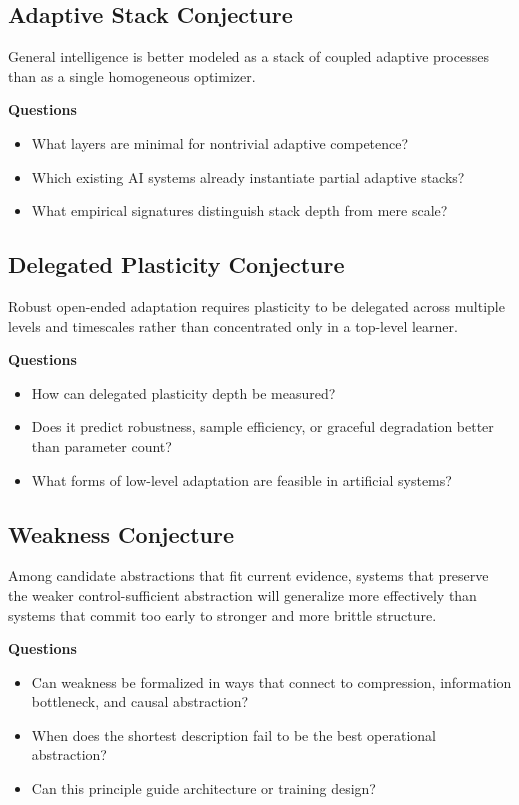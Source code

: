 \documentclass[11pt]{article}
\begin{document}
\subsection{Adaptive Stack Conjecture}

General intelligence is better modeled as a stack of coupled adaptive processes than as a single homogeneous optimizer.

\textbf{Questions}
\begin{itemize}
\item What layers are minimal for nontrivial adaptive competence?
\item Which existing AI systems already instantiate partial adaptive stacks?
\item What empirical signatures distinguish stack depth from mere scale?

\end{itemize}

\subsection{Delegated Plasticity Conjecture}

Robust open-ended adaptation requires plasticity to be delegated across multiple levels and timescales rather than concentrated only in a top-level learner.

\textbf{Questions}
\begin{itemize}
\item How can delegated plasticity depth be measured?
\item Does it predict robustness, sample efficiency, or graceful degradation better than parameter count?
\item What forms of low-level adaptation are feasible in artificial systems?

\end{itemize}

\subsection{Weakness Conjecture}

Among candidate abstractions that fit current evidence, systems that preserve the weaker control-sufficient abstraction will generalize more effectively than systems that commit too early to stronger and more brittle structure.

\textbf{Questions}
\begin{itemize}
\item Can weakness be formalized in ways that connect to compression, information bottleneck, and causal abstraction?
\item When does the shortest description fail to be the best operational abstraction?
\item Can this principle guide architecture or training design?

\end{itemize}
\end{document}
